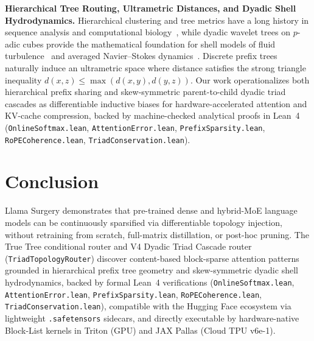\documentclass[11pt,a4paper]{article}
\begin{document}
\textbf{Hierarchical Tree Routing, Ultrametric Distances, and Dyadic Shell Hydrodynamics.} Hierarchical clustering and tree metrics have a long history in sequence analysis and computational biology~\citep{bradley2010mumford}, while dyadic wavelet trees on $p$-adic cubes provide the mathematical foundation for shell models of fluid turbulence~\citep{katz2005dyadic} and averaged Navier--Stokes dynamics~\citep{tao2016blowup}. Discrete prefix trees naturally induce an ultrametric space where distance satisfies the strong triangle inequality $d(x,z) \le \max(d(x,y), d(y,z))$. Our work operationalizes both hierarchical prefix sharing and skew-symmetric parent-to-child dyadic triad cascades as differentiable inductive biases for hardware-accelerated attention and KV-cache compression, backed by machine-checked analytical proofs in Lean~4 (\texttt{OnlineSoftmax.lean}, \texttt{AttentionError.lean}, \texttt{PrefixSparsity.lean}, \texttt{RoPECoherence.lean}, \texttt{TriadConservation.lean}).

\section{Conclusion}

Llama Surgery demonstrates that pre-trained dense and hybrid-MoE language models can be continuously sparsified via differentiable topology injection, without retraining from scratch, full-matrix distillation, or post-hoc pruning. The True Tree conditional router and V4 Dyadic Triad Cascade router (\texttt{TriadTopologyRouter}) discover content-based block-sparse attention patterns grounded in hierarchical prefix tree geometry and skew-symmetric dyadic shell hydrodynamics, backed by formal Lean~4 verifications (\texttt{OnlineSoftmax.lean}, \texttt{AttentionError.lean}, \texttt{PrefixSparsity.lean}, \texttt{RoPECoherence.lean}, \texttt{TriadConservation.lean}), compatible with the Hugging Face ecosystem via lightweight \texttt{.safetensors} sidecars, and directly executable by hardware-native Block-List kernels in Triton (GPU) and JAX Pallas (Cloud TPU v6e-1).
\end{document}
